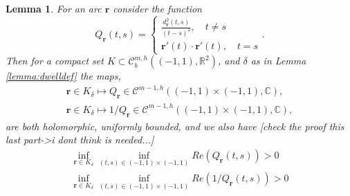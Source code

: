 \documentclass{article}
\newtheorem{lemma}[theorem]{Lemma}
\newcommand{\todo}[1]{{\color{red}[#1]}}
\newcommand{\IC}{{\mathbb C}}
\newcommand{\IR}{{\mathbb R}}
\newcommand{\cmspaceh}[4]{\mathcal{C}^{#1,#2} \left( #3, #4 \right)}
\newcommand{\rgeoh}[2]{\mathcal{C}_b^{#1,#2}\left( (-1,1), \IR^2 \right)}
\newcommand{\br}{\bm{r}}
\begin{document}
\begin{lemma}
\label{lemma:Qfun}
For an arc $\br$ consider the function 
$$
Q_{\br}(t,s) = \begin{cases}
\frac{d^2_{\br}(t,s)}{(t-s)^2}, \quad t\neq s \\
\br '(t) \cdot \br '(t), \quad t =s 
\end{cases}.
$$
Then for a compact set $K \subset \rgeoh{m}{h}$, and $\delta$ as in Lemma \ref{lemma:dwelldef} the maps, 
\begin{align*}
\br \in K_\delta \mapsto Q_{\br} \in \cmspaceh{m-1}{h}{(-1,1)\times(-1,1)}{\IC}, \\
\br \in K_\delta \mapsto 1/Q_{\br} \in \cmspaceh{m-1}{h}{(-1,1)\times(-1,1)}{\IC}, 
\end{align*} 
are both holomorphic, uniformly bounded,  and we also have \todo{check the proof this last part->i dont think is needed...}
\begin{align*}
\inf_{\br \in K_\delta} \inf_{(t,s) \in (-1,1)\times (-1,1)} Re(Q_{\br}(t,s)) >0 \\
\inf_{\br \in K_\delta} \inf_{(t,s) \in (-1,1)\times (-1,1)} Re(1/Q_{\br}(t,s)) >0 
\end{align*}
\end{lemma}
\end{document}
